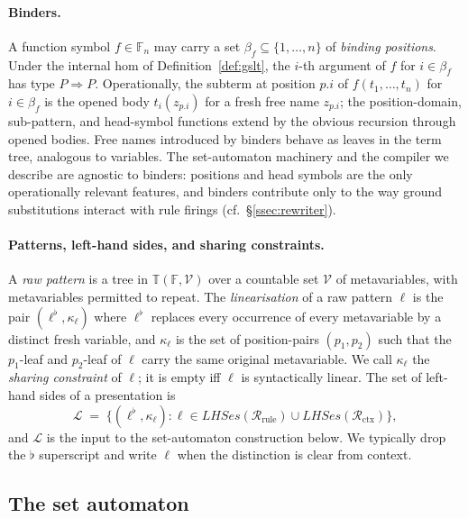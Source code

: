 \documentclass[11pt]{article}
\theoremstyle{plain}
\theoremstyle{definition}
\theoremstyle{remark}
\newcommand{\Terms}{\mathbb{T}}
\newcommand{\Lhs}{\mathcal{L}}
\begin{document}
\paragraph{Binders.}
A function symbol $f \in \mathbb{F}_n$ may carry a set
$\beta_f \subseteq \{1, \ldots, n\}$ of \emph{binding positions}. Under the
internal hom of Definition~\ref{def:gslt}, the $i$-th argument of $f$ for
$i \in \beta_f$ has type $P \Rightarrow P$. Operationally, the subterm at
position $p.i$ of $f(t_1, \ldots, t_n)$ for $i \in \beta_f$ is the opened
body $t_i(z_{p.i})$ for a fresh free name $z_{p.i}$; the position-domain,
sub-pattern, and head-symbol functions extend by the obvious recursion
through opened bodies. Free names introduced by binders behave as leaves in
the term tree, analogous to variables. The set-automaton machinery and the
compiler we describe are agnostic to binders: positions and head symbols
are the only operationally relevant features, and binders contribute only
to the way ground substitutions interact with rule firings (cf.\ \S\ref{ssec:rewriter}).

\paragraph{Patterns, left-hand sides, and sharing constraints.}
A \emph{raw pattern} is a tree in $\Terms(\mathbb{F}, \mathcal{V})$ over a
countable set $\mathcal{V}$ of metavariables, with metavariables permitted
to repeat. The \emph{linearisation} of a raw pattern $\ell$ is the pair
$(\ell^{\flat}, \kappa_{\ell})$ where $\ell^{\flat}$ replaces every
occurrence of every metavariable by a distinct fresh variable, and
$\kappa_{\ell}$ is the set of position-pairs $(p_1, p_2)$ such that the
$p_1$-leaf and $p_2$-leaf of $\ell$ carry the same original
metavariable. We call $\kappa_{\ell}$ the \emph{sharing constraint} of
$\ell$; it is empty iff $\ell$ is syntactically linear. The set of
left-hand sides of a presentation is
\[
  \Lhs \;=\; \{(\ell^{\flat}, \kappa_{\ell}) : \ell \in \mathit{LHSes}(\mathcal{R}_{\mathrm{rule}}) \cup \mathit{LHSes}(\mathcal{R}_{\mathrm{ctx}})\},
\]
and $\Lhs$ is the input to the set-automaton construction below. We
typically drop the $\flat$ superscript and write $\ell$ when the
distinction is clear from context.

\subsection{The set automaton}\label{ssec:set-automaton}
\end{document}
